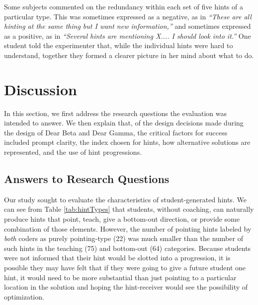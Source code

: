 \documentclass[12pt,twoside]{mitthesis}
\begin{document}
Some subjects commented on the redundancy within each set of five hints of a particular type. This was sometimes expressed as a negative, as in {\it ``These are all hinting at the same thing but I want new information,''} and sometimes expressed as a positive, as in {\it ``Several hints are mentioning X.... I should look into it.''} One student told the experimenter that, while the individual hints were hard to understand, together they formed a clearer picture in her mind about what to do.


\section{Discussion}
In this section, we first address the research questions the evaluation was intended to answer. We then explain that, of the design decisions made during the design of Dear Beta and Dear Gamma, the critical factors for success included prompt clarity, the index chosen for hints, how alternative solutions are represented, and the use of hint progressions.

\subsection{Answers to Research Questions}

Our study sought to evaluate the characteristics of student-generated hints. We can see from Table \ref{tab:hintTypes} that students, without coaching, can naturally produce hints that point, teach, give a bottom-out direction, or provide some combination of those elements. However, the number of pointing hints labeled by {\it both} coders as purely pointing-type (22) was much smaller than the number of such hints in the teaching (75) and bottom-out (64) categories. Because students were not informed that their hint would be slotted into a progression, it is possible they may have felt that if they were going to give a future student one hint, it would need to be more substantial than just pointing to a particular location in the solution and hoping the hint-receiver would see the possibility of optimization.
\end{document}
